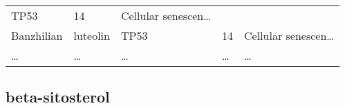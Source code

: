 \documentclass[
]{article}
\begin{document}
\begin{longtable}[]{@{}lllll@{}}
\begin{minipage}[t]{0.12\columnwidth}
TP53\strut
\end{minipage} & \begin{minipage}[t]{0.19\columnwidth}\raggedright
14\strut
\end{minipage} & \begin{minipage}[t]{0.21\columnwidth}\raggedright
Cellular senescen\ldots{}\strut
\end{minipage}\tabularnewline
\begin{minipage}[t]{0.17\columnwidth}\raggedright
Banzhilian\strut
\end{minipage} & \begin{minipage}[t]{0.16\columnwidth}\raggedright
luteolin\strut
\end{minipage} & \begin{minipage}[t]{0.12\columnwidth}\raggedright
TP53\strut
\end{minipage} & \begin{minipage}[t]{0.19\columnwidth}\raggedright
14\strut
\end{minipage} & \begin{minipage}[t]{0.21\columnwidth}\raggedright
Cellular senescen\ldots{}\strut
\end{minipage}\tabularnewline
\begin{minipage}[t]{0.17\columnwidth}\raggedright
\ldots{}\strut
\end{minipage} & \begin{minipage}[t]{0.16\columnwidth}\raggedright
\ldots{}\strut
\end{minipage} & \begin{minipage}[t]{0.12\columnwidth}\raggedright
\ldots{}\strut
\end{minipage} & \begin{minipage}[t]{0.19\columnwidth}\raggedright
\ldots{}\strut
\end{minipage} & \begin{minipage}[t]{0.21\columnwidth}\raggedright
\ldots{}\strut
\end{minipage}\tabularnewline
\bottomrule
\end{longtable}

\begin{center}\vspace{1.5cm}\end{center}

\hypertarget{res2}{%
\subsection{beta-sitosterol}\label{res2}}
\end{document}
